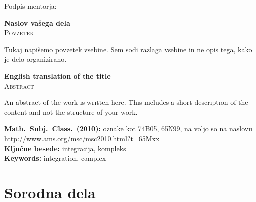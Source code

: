 \documentclass[12pt,a4paper,twoside]{article}
\newcommand{\naslovdela}{Naslov vašega dela}
\newcommand{\kljucnebesede}{integracija\sep kompleks} %
\newcommand{\keywords}{integration\sep complex} %
\newcommand{\sep}{, }  %
\theoremstyle{definition} %
\theoremstyle{plain} %
\numberwithin{equation}{section}  %
\begin{document}
\vspace{2cm}
\hspace*{\fill} Podpis mentorja: \phantom{prostor za podpis}


\cleardoublepage
{}

\begin{center}
\textbf{\naslovdela} \\[3mm]
\textsc{Povzetek} \\[2mm]
\end{center}
Tukaj napišemo povzetek vsebine. Sem sodi razlaga vsebine in ne opis tega, kako je delo
organizirano.

\vfill
\begin{center}
\textbf{English translation of the title} \\[3mm] %
\textsc{Abstract}\\[2mm]
\end{center}

An abstract of the work is written here. This includes a short description of
the content and not the structure of your work.

\vfill\noindent
\textbf{Math.~Subj.~Class.~(2010):} oznake kot 74B05, 65N99, na voljo so na naslovu
\url{http://www.ams.org/msc/msc2010.html?t=65Mxx} \\[1mm]
\textbf{Ključne besede:} \kljucnebesede \\[1mm]
\textbf{Keywords:} \keywords

\cleardoublepage

\setcounter{page}{1}    %

\section{Sorodna dela}
\end{document}

